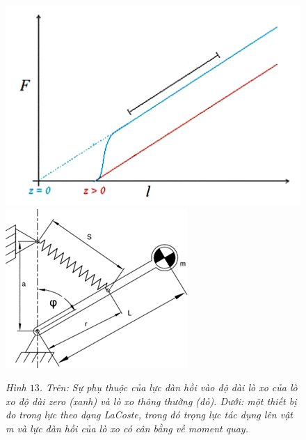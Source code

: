 \begin{multicols}{2}
	\begin{figure}[H]
		\vspace*{-5pt}
		\centering
		\captionsetup{labelformat= empty, justification=centering}
		\includegraphics[width =1\linewidth]{15}
		\includegraphics[width =1\linewidth]{15b}
		\caption{\small\textit{\color{timhieukhoahoc}Hình $13$. Trên: Sự phụ thuộc của lực đàn hồi vào độ dài lò xo của lò xo độ dài zero (xanh) và lò xo thông thường (đỏ). Dưới: một thiết bị đo trong lực theo dạng LaCoste, trong đó trọng lực tác dụng lên vật m và lực đàn hồi của lò xo có cân bằng về moment quay.}}
		\vspace*{-10pt}
	\end{figure}

\end{multicols}

